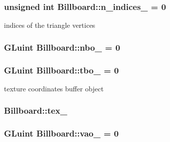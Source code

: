\subsubsection[{\texorpdfstring{n\+\_\+indices\+\_\+}{n_indices_}}]{\setlength{\rightskip}{0pt plus 5cm}unsigned int Billboard\+::n\+\_\+indices\+\_\+ = 0\hspace{0.3cm}{\ttfamily [private]}}\hypertarget{classBillboard_a14d9a38844af56e7aa7d18862814e0e5}{}\label{classBillboard_a14d9a38844af56e7aa7d18862814e0e5}


indices of the triangle vertices 

\subsubsection[{\texorpdfstring{nbo\+\_\+}{nbo_}}]{\setlength{\rightskip}{0pt plus 5cm}G\+Luint Billboard\+::nbo\+\_\+ = 0\hspace{0.3cm}{\ttfamily [private]}}\hypertarget{classBillboard_a4da12ff3881a95c7d26de24722de731e}{}\label{classBillboard_a4da12ff3881a95c7d26de24722de731e}
\subsubsection[{\texorpdfstring{tbo\+\_\+}{tbo_}}]{\setlength{\rightskip}{0pt plus 5cm}G\+Luint Billboard\+::tbo\+\_\+ = 0\hspace{0.3cm}{\ttfamily [private]}}\hypertarget{classBillboard_ab5ea6cc8be0336426baba343a9c23af2}{}\label{classBillboard_ab5ea6cc8be0336426baba343a9c23af2}


texture coordinates buffer object 

\subsubsection[{\texorpdfstring{tex\+\_\+}{tex_}}]{ Billboard\+::tex\+\_\+}\hypertarget{classBillboard_a206d9f248ea6491e63aa19486b65b944}{}\label{classBillboard_a206d9f248ea6491e63aa19486b65b944}
\subsubsection[{\texorpdfstring{vao\+\_\+}{vao_}}]{\setlength{\rightskip}{0pt plus 5cm}G\+Luint Billboard\+::vao\+\_\+ = 0\hspace{0.3cm}{\ttfamily [private]}}\hypertarget{classBillboard_a4bd7b1fd858c56e1f02a27b84d29c1e3}{}\label{classBillboard_a4bd7b1fd858c56e1f02a27b84d29c1e3}
